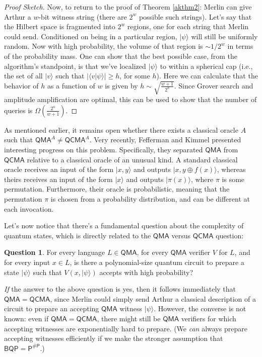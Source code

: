 \documentclass[12pt]{report}
\theoremstyle{plain}
\theoremstyle{definition}
\newtheorem{question}[theorem]{Question}
\renewcommand{\ket}[1]{|#1\rangle}
\newcommand{\braket}[2]{\langle#1|#2\rangle}
\begin{document}
\begin{proof}[Proof Sketch]
Now, to return to the proof of Theorem \ref{akthm2}: Merlin can give Arthur a $w$-bit witness string (there are $2^w$ possible such
strings).
Let's say that the Hilbert space is fragmented into $2^w$ regions, one for each string that Merlin could send.
Conditioned on being in a particular region, $\ket{\psi}$ will still be
uniformly random.
Now with high probability, the volume of that region is $\sim 1 / 2^w$ in terms of the probability mass.
One can show that the best possible case, from the algorithm's standpoint, is that we've localized $\ket{ \psi }$ to within a spherical cap (i.e., the set of all $\ket{v}$ such that $| \braket{ v }{ \psi } |
\geq h$, for some $h$).
Here we can calculate that the behavior of $h$ as a function of $w$ is given by $h \sim \sqrt{\frac{w + 1}{2^n}}$.
Since Grover search and amplitude amplification are optimal, this can be used to show that the number of queries is $\Omega\left(\frac{2^n}{w+1}\right)$.

\end{proof}

As mentioned earlier, it remains open whether there exists a classical oracle $A$ such that $\mathsf{QMA}^A \neq \mathsf{QCMA}^A$.
Very recently, Fefferman and Kimmel \cite{FK15} presented interesting progress on this problem.
Specifically, they separated $\mathsf{QMA}$ from $\mathsf{QCMA}$ relative to a classical oracle of an unusual kind.
A standard classical oracle receives an input of the form $\ket{x,y}$ and outputs $\ket{x, y\oplus f(x)}$, whereas theirs receives an input of the form $\ket{x}$ and outputs $\ket{\pi(x)}$, where $\pi$ is some permutation.  Furthermore, their oracle is probabilistic, meaning that the permutation $\pi$ is chosen from a probability distribution, and can be different at each invocation.

Let's now notice that there's a fundamental question about the complexity of quantum states, which is directly related to the $\mathsf{QMA}$ versus $\mathsf{QCMA}$ question:

\begin{question}
\label{qmaques}
For every language $L\in \mathsf{QMA}$, for every $\mathsf{QMA}$ verifier $V$ for $L$, and for every input $x\in L$, is there a polynomial-size quantum circuit to prepare a state $\ket{ \psi}$ such that $V(x,\ket{\psi})$ accepts with high probability?
\end{question}

{\em If} the answer to the above question is yes, then it follows immediately that $\mathsf{QMA}=\mathsf{QCMA}$, since Merlin could simply send Arthur a classical description of a circuit
to prepare an accepting $\mathsf{QMA}$ witness $\ket{ \psi}$.  However, the converse is not known: even if $\mathsf{QMA}=\mathsf{QCMA}$, there might still be $\mathsf{QMA}$ verifiers for
which accepting witnesses are exponentially hard to prepare.  (We {\em can} always prepare accepting witnesses efficiently if we make the stronger assumption that $\mathsf{BQP}=\mathsf{P^{\#P}}$.)
\end{document}
